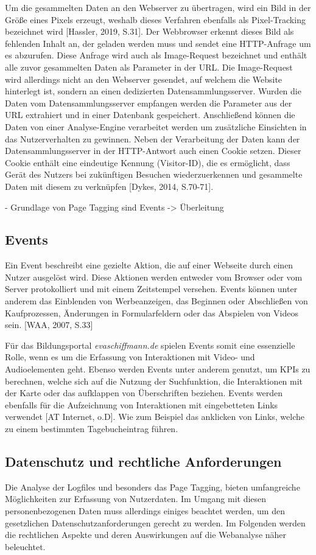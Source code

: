 Um die gesammelten Daten an den Webserver zu übertragen, wird ein Bild in der Größe eines Pixels erzeugt, weshalb dieses Verfahren ebenfalls als Pixel-Tracking bezeichnet wird [Hassler, 2019, S.31]. Der Webbrowser erkennt dieses Bild als fehlenden Inhalt an, der geladen werden muss und sendet eine HTTP-Anfrage um es abzurufen. Diese Anfrage wird auch als Image-Request bezeichnet und enthält alle zuvor gesammelten Daten als Parameter in der URL. Die Image-Request wird allerdings nicht an den Webserver gesendet, auf welchem die Website hinterlegt ist, sondern an einen dedizierten Datensammlungsserver. Wurden die Daten vom Datensammlungsserver empfangen werden die Parameter aus der URL extrahiert und in einer Datenbank gespeichert. Anschließend können die Daten von einer Analyse-Engine verarbeitet werden um zusätzliche Einsichten in das Nutzerverhalten zu gewinnen. Neben der Verarbeitung der Daten kann der Datensammlungsserver in der HTTP-Antwort auch einen Cookie setzen. Dieser Cookie enthält eine eindeutige Kennung (Visitor-ID), die es ermöglicht, dass Gerät des Nutzers bei zukünftigen Besuchen wiederzuerkennen und gesammelte Daten mit diesem zu verknüpfen [Dykes, 2014, S.70-71].

- Grundlage von Page Tagging sind Events -> Überleitung

\subsection{Events}
Ein Event beschreibt eine gezielte Aktion, die auf einer Webseite durch einen Nutzer ausgelöst wird. Diese Aktionen werden entweder vom Browser oder vom Server protokolliert und mit einem Zeitstempel versehen. Events können unter anderem das Einblenden von Werbeanzeigen, das Beginnen oder Abschließen von Kaufprozessen, Änderungen in Formularfeldern oder das Abspielen von Videos sein. [WAA, 2007, S.33]

Für das Bildungsportal \textit{evaschiffmann.de} spielen Events somit eine essenzielle Rolle, wenn es um die Erfassung von Interaktionen mit Video- und Audioelementen geht. Ebenso werden Events unter anderem genutzt, um KPIs zu berechnen, welche sich auf die Nutzung der Suchfunktion, die Interaktionen mit der Karte oder das aufklappen von Überschriften beziehen. Events werden ebenfalls für die Aufzeichnung von Interaktionen mit eingebetteten Links verwendet [AT Internet, o.D]. Wie zum Beispiel das anklicken von Links, welche zu einem bestimmten Tagebucheintrag führen.

\subsection{Datenschutz und rechtliche Anforderungen}
\label{sec:datenschutz}
Die Analyse der Logfiles und besonders das Page Tagging, bieten umfangreiche Möglichkeiten zur Erfassung von Nutzerdaten. Im Umgang mit diesen personenbezogenen Daten muss allerdings einiges beachtet werden, um den gesetzlichen Datenschutzanforderungen gerecht zu werden. Im Folgenden werden die rechtlichen Aspekte und deren Auswirkungen auf die Webanalyse näher beleuchtet.

